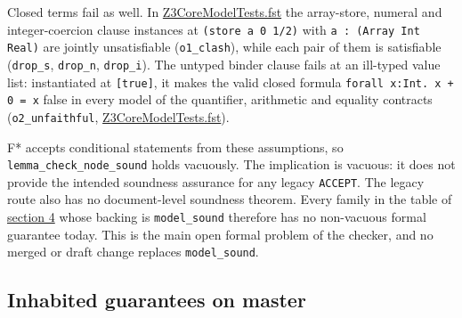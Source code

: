 \documentclass[10pt,a4paper]{article}
\begin{document}
Closed terms fail as well. In \href{https://github.com/Z3Prover/z3/blob/8fbb275aba0472e862e289c7af1331b3bd5d512c/fstar/Z3CoreModelTests.fst\#L462-L543}{Z3Core\allowbreak{}Model\allowbreak{}Tests.\allowbreak{}fst} the array-store, numeral and integer-coercion clause instances at \texttt{(\allowbreak{}store a 0 1/\allowbreak{}2)} with \texttt{a :\allowbreak{} (\allowbreak{}Array Int Real)} are jointly unsatisfiable (\texttt{o1\_\allowbreak{}clash}), while each pair of them is satisfiable (\texttt{drop\_\allowbreak{}s}, \texttt{drop\_\allowbreak{}n}, \texttt{drop\_\allowbreak{}i}). The untyped binder clause fails at an ill-typed value list: instantiated at \texttt{[true]}, it makes the valid closed formula \texttt{forall x:\allowbreak{}Int.\allowbreak{} x + 0 =\allowbreak{} x} false in every model of the quantifier, arithmetic and equality contracts (\texttt{o2\_\allowbreak{}unfaithful}, \href{https://github.com/Z3Prover/z3/blob/8fbb275aba0472e862e289c7af1331b3bd5d512c/fstar/Z3CoreModelTests.fst\#L545-L575}{Z3Core\allowbreak{}Model\allowbreak{}Tests.\allowbreak{}fst}).

F* accepts conditional statements from these assumptions, so \texttt{lemma\_\allowbreak{}check\_\allowbreak{}node\_\allowbreak{}sound} holds vacuously. The implication is vacuous: it does not provide the intended soundness assurance for any legacy \texttt{ACCEPT}. The legacy route also has no document-level soundness theorem. Every family in the table of \hyperref[sec:4-theory-coverage]{section 4} whose backing is \texttt{model\_\allowbreak{}sound} therefore has no non-vacuous formal guarantee today. This is the main open formal problem of the checker, and no merged or draft change replaces \texttt{model\_\allowbreak{}sound}.

\subsection{Inhabited guarantees on master}\label{sec:52-inhabited-guarantees-on-master}
\end{document}
